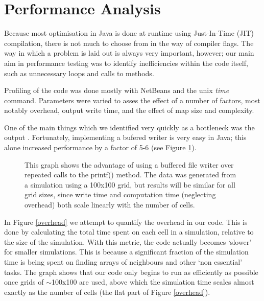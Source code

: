 \section{Performance Analysis} %
   
    Because most optimisation in Java is done at runtime using Just-In-Time (JIT) compilation, there is not much to choose from in the way
  	 of compiler flags. The way in which a problem is laid out is always very important, however; our main aim in performance testing
 	 was to identify inefficiencies within the code itself, such as unnecessary loops and calls to methods.\newline{}
 	
 	 Profiling of the code was done mostly with NetBeans and the unix \emph{time} command. Parameters were varied to asses the effect of a number of 
 	 factors, most notably overhead, output write time, and the effect of map size and complexity.\newline{}
 
 	 One of the main things which we identified	very quickly as a bottleneck was the output . Fortunately, implementing a bufered writer is
	 very easy in Java; this alone increased performance by a factor of 5-6 (see Figure \ref{buffering}).\newline{}
	
  \begin{figure}[h]
  
  \caption{\label{buffering}This graph shows the advantage of using a buffered file writer over repeated calls to the printf() method. 
  The data was generated from a simulation using a 100x100 grid, but results will be similar for all grid sizes, since write time and computation
  time (neglecting overhead) both scale linearly with the number of cells.}
  \end{figure} 

	 In Figure \ref{overhead} we attempt to quantify the overhead in our code. This is done by calculating the total time spent on each cell in a 
	 simulation, relative to the size of the simulation. With this metric, the code actually becomes `slower' for smaller simulations. This is 
	 because a significant fraction of the simulation time is being spent on finding arrays of neighbours and other `non essential' tasks. The graph
	 shows that our code only begins to run as efficiently as possible once grids of $\sim$100x100 are used, above which the simulation time scales
	 almost exactly as the number of cells (the flat part of Figure \ref{overhead}).\newline{}
	 
